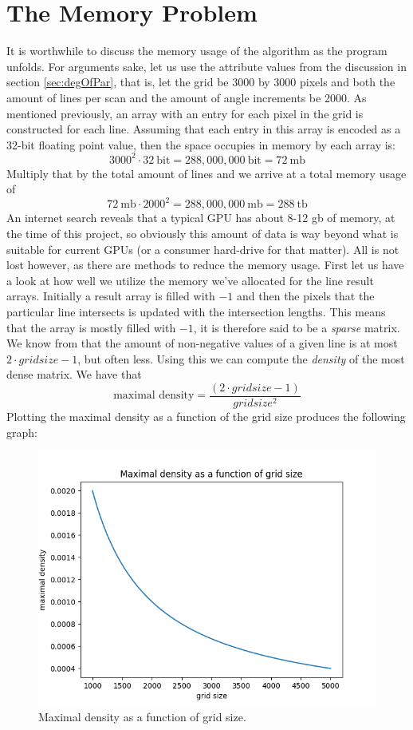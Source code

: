 \section{The Memory Problem}\label{sec:mem_problem}
It is worthwhile to discuss the memory usage of the algorithm as the program unfolds. For arguments sake, let us use the attribute values from the discussion in section \ref{sec:degOfPar}, that is, let the grid be 3000 by 3000 pixels and both the amount of lines per scan and the amount of angle increments be 2000. As mentioned previously, an array with an entry for each pixel in the grid is constructed for each line. Assuming that each entry in this array is encoded as a 32-bit floating point value, then the space occupies in memory by each array is:
$$3000^2 \cdot 32~\text{bit} = 288,000,000 ~\text{bit} = 72 ~\text{mb}$$ 
Multiply that by the total amount of lines and we arrive at a total memory usage of 
$$72 ~\text{mb} \cdot 2000^2 = 288,000,000~\text{mb} = 288~\text{tb}$$ 
An internet search reveals that a typical GPU has about 8-12 gb of memory, at the time of this project, so obviously this amount of data is way beyond what is suitable for current GPUs (or a consumer hard-drive for that matter). 
All is not lost however, as there are methods to reduce the memory usage. First let us have a look at how well we utilize the memory we've allocated for the line result arrays.
Initially a result array is filled with $-1$ and then the pixels that the particular line intersects is updated with the intersection lengths. This means that the array is mostly filled with $-1$, it is therefore said to be a \emph{sparse} matrix. We know from \cite{FCT} that the amount of non-negative values of a given line is at most $2 \cdot gridsize - 1$, but often less. Using this we can compute the \emph{density} of the most dense matrix. We have that 
$$\text{maximal density} = \frac{(2 \cdot gridsize - 1)}{gridsize^2}$$
Plotting the maximal density as a function of the grid size produces the following graph:
\begin{figure}[H]
  \centering
  \includegraphics[scale=0.8]{figures/maxdensity.png}
  \caption{Maximal density as a function of grid size.}
\end{figure}

